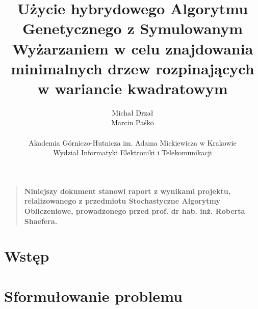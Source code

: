 \documentclass[12pt]{article}
\title{Użycie hybrydowego Algorytmu Genetycznego z Symulowanym Wyżarzaniem w celu znajdowania minimalnych drzew rozpinających w wariancie kwadratowym}
\author
{Michał Drzał\\Marcin Paśko\\
\\
\normalsize{Akademia Górniczo-Hutnicza im. Adama Mickiewicza w Krakowie}\\
\normalsize{Wydział Informatyki Elektroniki i Telekomunikacji}\\
}
\date{}
\newenvironment{sciabstract}{%
\begin{quote} \bf}
{\end{quote}}
\begin{document}
 


\baselineskip24pt


\maketitle 




\begin{sciabstract}
  Niniejszy dokument stanowi raport z wynikami projektu, relalizowanego z przedmiotu Stochastyczne Algorytmy Obliczeniowe, prowadzonego przed prof. dr hab. inż. Roberta Shaefera.
\end{sciabstract}




\section*{Wstęp}





\section{Sformułowanie problemu}
\end{document}
